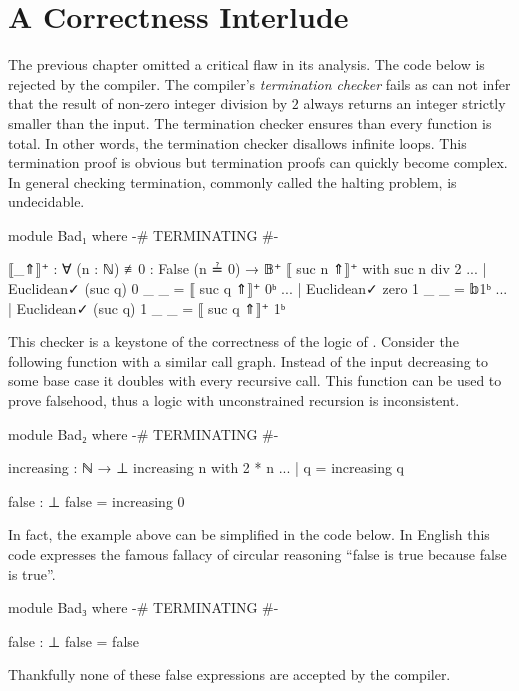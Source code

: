 \documentclass[./Thesis.tex]{subfiles}
\begin{document}
\section{A Correctness Interlude}
\label{sec:a-correctness-interlude}
The previous chapter omitted a critical flaw in its analysis. The code below is
rejected by the \Agda{} compiler. The compiler's \textit{termination checker} \cite{agda}
fails as \Agda{} can not infer that the result of non-zero integer division by
$2$ always returns an integer strictly smaller than the input. The termination
checker ensures than every function is total. In other words,
the termination checker disallows infinite loops. This termination proof
is obvious but termination proofs can quickly become complex. In general checking
termination, commonly called the halting problem, is undecidable. 
\begin{code}[hide]
  module Bad₁ where
    {-# TERMINATING #-}
\end{code}
\begin{code}
    ⟦_⇑⟧⁺ : ∀ (n : ℕ) {≢0 : False (n ≟ 0)} → 𝔹⁺
    ⟦ suc n ⇑⟧⁺ with suc n div 2
    ... | Euclidean✓ (suc q) 0 _ _ = ⟦ suc q ⇑⟧⁺ 0ᵇ
    ... | Euclidean✓ zero    1 _ _ = 𝕓1ᵇ
    ... | Euclidean✓ (suc q) 1 _ _ = ⟦ suc q ⇑⟧⁺ 1ᵇ
\end{code}
This checker is a keystone of the correctness of the logic of \Agda{}. Consider
the following function with a similar call graph. Instead of the input
decreasing to some base case it doubles with every recursive call. This function can
be used to prove falsehood, thus a logic with unconstrained recursion is
inconsistent.
\begin{code}[hide]
  module Bad₂ where
    {-# TERMINATING #-}
\end{code}
\begin{code}
    increasing : ℕ → ⊥
    increasing n with 2 * n
    ... | q = increasing q

    false : ⊥
    false = increasing 0
\end{code}
In fact, the example above can be simplified in the code below. In English
this code expresses the famous fallacy of circular reasoning ``false is true
because false is true''.
\begin{code}[hide]
  module Bad₃ where
    {-# TERMINATING #-}
\end{code}
\begin{code}
    false : ⊥
    false = false
\end{code}
Thankfully none of these false expressions are accepted by the \Agda{} compiler.
\end{document}
